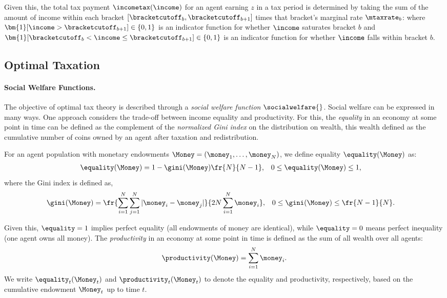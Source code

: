 Given this, the total tax payment $\incometax(\income)$ for an agent earning $z$ in a tax period is determined by taking the sum of the amount of income within each bracket $[\bracketcutoff_b, \bracketcutoff_{b+1}]$ times that bracket's marginal rate $\mtaxrate_b$:
where $\bm{1}[ \income > \bracketcutoff_{b+1} ]\in \{0,1\}$ is an indicator function for whether $\income$ saturates bracket $b$ and $\bm{1}[ \bracketcutoff_b < \income \leq \bracketcutoff_{b+1} ]\in \{0,1\}$ is an indicator function for whether $\income$ falls within bracket $b$.
\subsection{Optimal Taxation}
\label{sect:socialwelfarefunctions}
\paragraph{Social Welfare Functions.}
The objective of optimal tax theory is described through a \emph{social welfare function} $\socialwelfare{}$.
Social welfare can be expressed in many ways. One approach considers the trade-off between income equality and productivity.
For this, the {\em equality} in an economy at some point in time can be defined as the complement of the {\em normalized Gini index } on the distribution on wealth, this wealth defined as the cumulative number of coins owned by an agent after taxation and redistribution.

For an agent population with monetary endowments $\Money=(\money_1,\ldots,\money_{N})$, we define equality $\equality(\Money)$ as:
\begin{align}
 \equality(\Money) = 1 - \gini(\Money) \fr{N}{N-1},& \quad 0 \leq \equality(\Money) \leq 1,
\end{align}
where the Gini index is defined as,
\begin{align}
\gini(\Money) = \fr{\sum_{i=1}^N \sum_{j=1}^N |\money_i - \money_j|}{ 2N \sum_{i=1}^N \money_i},& \quad 0 \leq \gini(\Money) \leq \fr{N-1}{N}.
\end{align}

Given this, $\equality = 1$ implies perfect equality (all endowments of money are identical), while $\equality = 0$ means perfect inequality (one agent owns all money).
The {\em productivity} in an economy at some point in time is defined as the sum of all wealth over all agents:
\begin{align}
 \productivity(\Money) = \sum_{i=1}^N \money_i.
\end{align}
We write $\equality_t(\Money_t)$ and $\productivity_t(\Money_t)$ to denote the equality and productivity, respectively, based on the cumulative endowment $\Money_t$ up to  time $t$.

